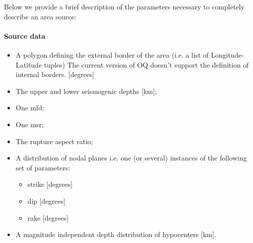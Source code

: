 Below we provide a brief description of the parameters necessary to 
completely describe an area source:
%
\paragraph{Source data}
\begin{itemize}
\item A polygon defining the external border of the area (i.e. a list of 
Longitude-Latitude tuples) The current version of OQ doesn't support the 
definition of internal borders.  [degrees]
\item The upper and lower seismogenic depths [km];
\item One \gls{mfd};
\item One \gls{msr};
\item The rupture aspect ratio;
\item A distribution of nodal planes i.e. one (or several) instances 
    of the following set of parameters:
\begin{itemize}
    \item \gls{strike} [degrees]
    \item \gls{dip} [degrees]
    \item \gls{rake} [degrees]
\end{itemize}
\item A magnitude independent depth distribution of hypocenters [km].
\end{itemize}

